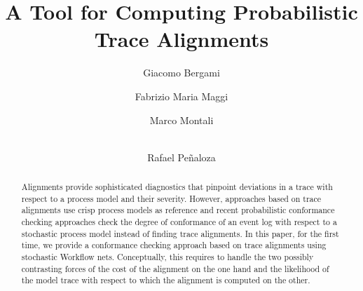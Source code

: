 \documentclass[runningheads]{llncs}
\begin{document}
%
\title{A Tool for Computing Probabilistic Trace Alignments}
%
%
\author{
	Giacomo Bergami \and
	Fabrizio Maria Maggi \and
	Marco Montali \and \\
	Rafael Pe\~naloza}

%

%
%
\maketitle              %

\begin{abstract}
Alignments provide sophisticated diagnostics that pinpoint deviations in a trace with respect to a process model and their severity. However, approaches based on trace alignments use crisp process models as reference and recent probabilistic conformance checking approaches check the degree of conformance of an event log with respect to a stochastic process model instead of finding trace alignments. In this paper, for the first time, we provide a conformance checking approach based on trace alignments using stochastic Workflow nets. Conceptually, this requires to handle the two possibly contrasting forces of the cost of the alignment on the one hand and the likelihood of the model trace with respect to which the alignment is computed on the other.
\end{abstract}
\end{document}
